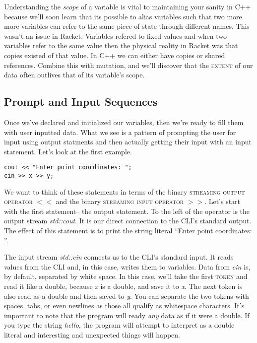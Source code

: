 \documentclass[]{tufte-handout}
\begin{document}
Understanding the \textit{scope} of a variable is vital to maintaining your sanity in C++ because we'll soon learn that its possible to alias variables such that two more more variables can refer to the same piece of state through different names. This wasn't an issue in Racket. Variables refered to fixed values and when two variables refer to the same value then the physical reality in Racket was that copies existed of that value. In C++ we can either have copies or shared references. Combine this with mutation, and we'll discover that the \textsc{extent} of our data often outlives that of its variable's scope.

\subsection{Prompt and Input Sequences}

Once we've declared and initialized our variables, then we're ready to fill them with user inputted data. What we see is a pattern of prompting the user for input using output statments and then actually getting their input with an input statement. Let's look at the first example.
\begin{verbatim}
cout << "Enter point coordinates: ";
cin >> x >> y;
\end{verbatim}

We want to think of these statements in terms of the binary \textsc{streaming output operator} $<<$ and the binary \textsc{streaming input operator} $>>$. Let's start with the first statement-- the output statement. To the left of the operator is the output stream \textit{std::cout}. It is our direct connection to the CLI's standard output. The effect of this statement is to print the string literal ``Enter point coordinates: ''.

The input stream \textit{std::cin} connects us to the CLI's standard input. It reads values from the CLI and, in this case, writes them to variables. Data from \textit{cin} is, by default, separated by white space. In this case, we'll take the first \textsc{token} and read it like a double, because \textit{x} is a double, and save it to \textit{x}. The next token is also read as a double and then saved to \textit{y}. You can separate the two tokens with spaces, tabs, or even newlines as those all qualify as whitespace characters. It's important to note that the program will ready \textit{any} data as if it were a double.  If you type the string \textit{hello}, the program will attempt to interpret as a double literal and interesting and unexpected things will happen.
\end{document}
